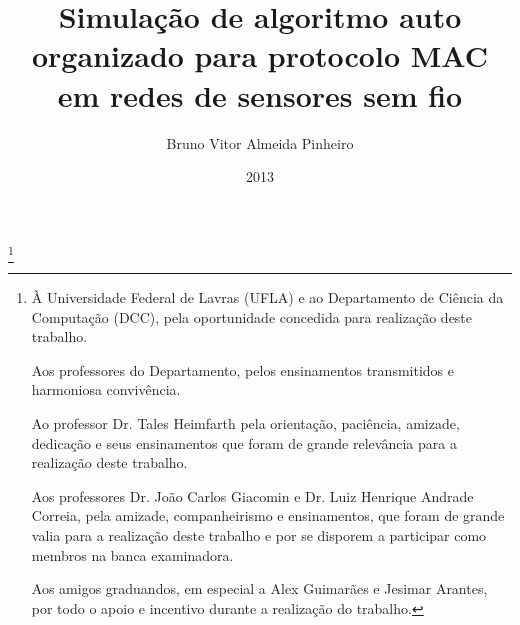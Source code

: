 \documentclass{uflamon}          %
\author{Bruno Vitor Almeida Pinheiro}
\title{Simulação de algoritmo auto organizado para protocolo MAC em redes de sensores sem fio}
\date{2013}
\begin{document}
\maketitle

\thanks{À Universidade Federal de Lavras (UFLA) e ao Departamento de Ciência da Computação (DCC), pela oportunidade concedida para realização deste trabalho.

Aos professores do Departamento, pelos ensinamentos transmitidos e harmoniosa convivência.

Ao professor Dr. Tales Heimfarth pela orientação, paciência, amizade, dedicação e seus ensinamentos que foram de grande relevância para a realização deste trabalho.

Aos professores Dr. João Carlos Giacomin e Dr. Luiz Henrique Andrade Correia, pela amizade, companheirismo e ensinamentos, que foram de grande valia para a realização deste trabalho e por se disporem a participar como membros na banca examinadora.

Aos amigos graduandos, em especial a Alex Guimarães e Jesimar Arantes, por todo o apoio e incentivo durante a realização do trabalho.}         %

\pagestyle{ufla}

\tableofcontents                           %
\listoffigures                             %
\end{document}
